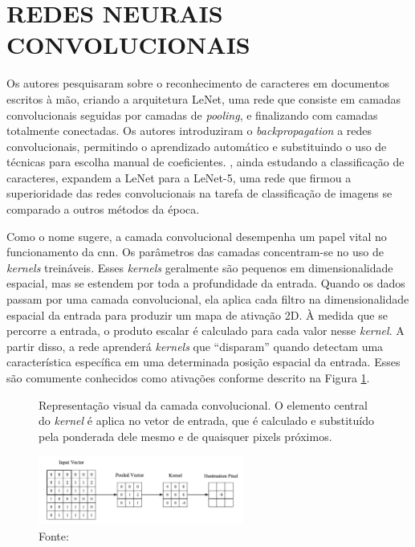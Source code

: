 \section{REDES NEURAIS CONVOLUCIONAIS}
\label{sec:cnn}


Os autores  pesquisaram sobre o reconhecimento de caracteres em documentos escritos à mão, criando a arquitetura LeNet, uma rede que consiste em camadas convolucionais seguidas por camadas de \textit{pooling}, e finalizando com camadas totalmente conectadas. Os autores introduziram o \textit{backpropagation} a redes convolucionais, permitindo o aprendizado automático e substituindo o uso de técnicas para escolha manual de coeficientes. , ainda estudando a classificação de caracteres, expandem a LeNet para a LeNet-5, uma rede que firmou a superioridade das redes convolucionais na tarefa de classificação de imagens se comparado a outros métodos da época.

Como o nome sugere, a camada convolucional desempenha um papel vital no funcionamento da \gls{cnn}. Os parâmetros das camadas concentram-se no uso de \textit{kernels} treináveis. Esses \textit{kernels} geralmente são pequenos em dimensionalidade espacial, mas se estendem por toda a profundidade da entrada. Quando os dados passam por uma camada convolucional, ela aplica cada filtro na dimensionalidade espacial da entrada para produzir um mapa de ativação 2D. À medida que se percorre a entrada, o produto escalar é calculado para cada valor nesse \textit{kernel}. A partir disso, a rede aprenderá \textit{kernels} que ``disparam'' quando detectam uma característica específica em uma determinada posição espacial da entrada. Esses são comumente conhecidos como ativações conforme descrito na Figura \ref{fig:fig024}.

\begin{figure}[h!]
    \centering
    \caption{Representação visual da camada convolucional. O elemento central do \textit{kernel} é aplica no vetor de entrada, que é calculado e substituído pela ponderada dele mesmo e de quaisquer pixels próximos.}
    \includegraphics[width=0.6\textwidth]{figures/fig024.png}
    \caption*{Fonte: \cite{osheaIntroductionConvolutionalNeural2015c}}
    \label{fig:fig024}
\end{figure}

